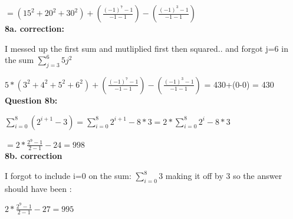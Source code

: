 \documentclass[11pt]{article}
\begin{document}
$ = (15^2+20^2+30^2)+ (\frac{(-1)^7-1}{-1-1})- (\frac{(-1)^3-1}{-1-1})$\\

\textbf{8a. correction:}

I messed up the first sum and mutliplied first then squared.. and forgot j=6 in the sum $\sum_{j=3}^{6} 5j^2$

$5*(3^2+4^2+5^2+6^2)+(\frac{(-1)^7-1}{-1-1})- (\frac{(-1)^3-1}{-1-1})$ = 430+(0-0) = 430\\

\textbf{Question 8b:}

$\sum_{i=0}^8 (2^{i+1} - 3) = \sum_{i=0}^8 2^{i+1} - 8*3 = 2* \sum_{i=0}^8 2^i - 8*3$

$= 2*\frac{2^9-1}{2-1} - 24= 998$\\

\textbf{8b. correction}

I forgot to include i=0 on the sum: $\sum_{i=0}^{8} 3$ making it off by 3 so the answer should have been :

$2*\frac{2^9-1}{2-1} - 27 = 995$
\end{document}
